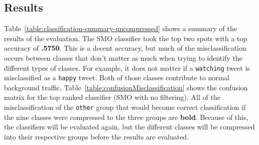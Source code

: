 \documentclass[12pt]{ucthesis}
\begin{document}
\subsection{Results}
\label{class-evaluation-results}
Table~\ref{table:classification-summary-uncompressed} shows a summary of the results of the evaluation.
The SMO classifier took the top two spots with a top accuracy of \textbf{.5750}.
This is a decent accuracy, but much of the misclassification occurs between classes that don't matter
as much when trying to identify the different types of classes. For example, it does not matter if
a \texttt{watching} tweet is misclassified as a \texttt{happy} tweet. Both of those classes contribute to
normal background traffic. Table~\ref{table:confusionMisclassification} shows the confusion matrix for the top
ranked classifier (SMO with no filtering). All of the misclassification of the \texttt{other} group that
would become correct classification if the nine classes were compressed to the three groups are \textbf{bold}.
Because of this, the classifiers will be evaluated again, but the different classes
will be compressed into their respective groups before the results are evaluated.
\end{document}
